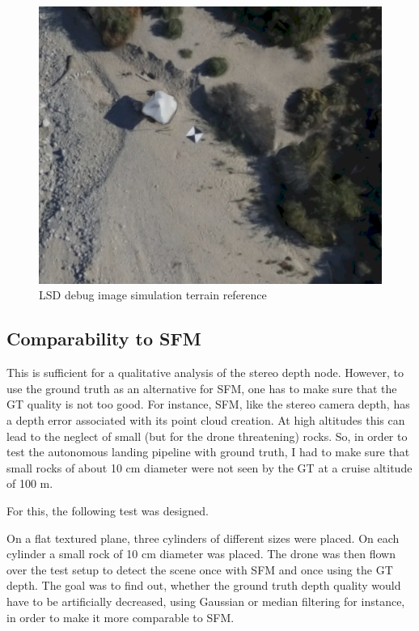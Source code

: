 \begin{figure}[ht]
\centering
\includegraphics[scale=0.25]{images/methodology/lsd_debug_reference.png}
\caption{LSD debug image simulation terrain reference}
\label{fig:gt_lsd_debug_reference}
\end{figure}

\subsection{Comparability to SFM}

This is sufficient for a qualitative analysis of the stereo depth node. However, to use the ground truth as an alternative for SFM, one has to make sure that the GT quality is not too good. For instance, SFM, like the stereo camera depth, has a depth error associated with its point cloud creation. At high altitudes this can lead to the neglect of small (but for the drone threatening) rocks. So, in order to test the autonomous landing pipeline with ground truth, I had to make sure that small rocks of about 10 cm diameter were not seen by the GT at a cruise altitude of 100 m.

For this, the following test was designed.

On a flat textured plane, three cylinders of different sizes were placed. On each cylinder a small rock of 10 cm diameter was placed. The drone was then flown over the test setup to detect the scene once with SFM and once using the GT depth. The goal was to find out, whether the ground truth depth quality would have to be artificially decreased, using Gaussian or median filtering for instance, in order to make it more comparable to SFM.

